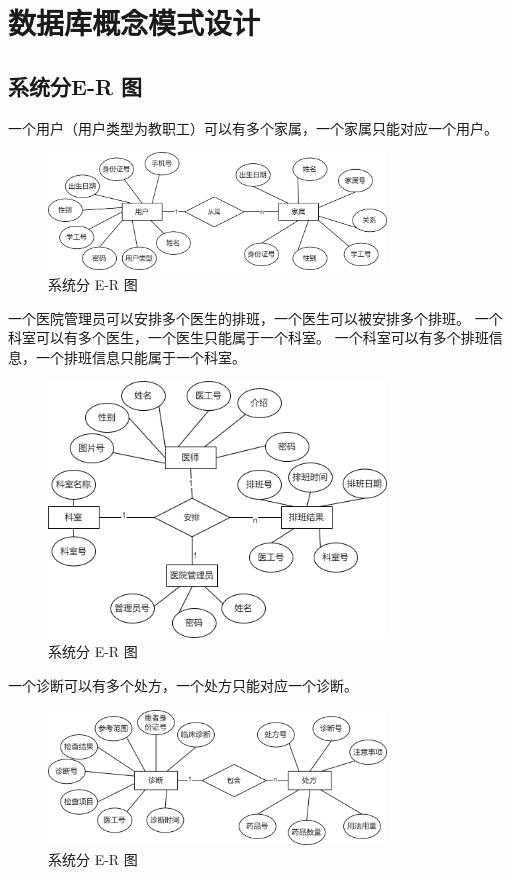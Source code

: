\documentclass{article}
\begin{document}
\section{数据库概念模式设计}

\subsection{系统分E-R 图}

一个用户（用户类型为教职工）可以有多个家属，一个家属只能对应一个用户。

\begin{figure}[H]
    \centering
    \includegraphics[width=0.8\textwidth]{images/dividedER1.png}
    \caption{系统分 E-R 图}
\end{figure}

一个医院管理员可以安排多个医生的排班，一个医生可以被安排多个排班。
一个科室可以有多个医生，一个医生只能属于一个科室。
一个科室可以有多个排班信息，一个排班信息只能属于一个科室。

\begin{figure}[H]
    \centering
    \includegraphics[width=0.8\textwidth]{images/dividedER2.png}
    \caption{系统分 E-R 图}
\end{figure}

一个诊断可以有多个处方，一个处方只能对应一个诊断。

\begin{figure}[H]
    \centering
    \includegraphics[width=0.8\textwidth]{images/dividedER3.png}
    \caption{系统分 E-R 图}
\end{figure}
\end{document}
